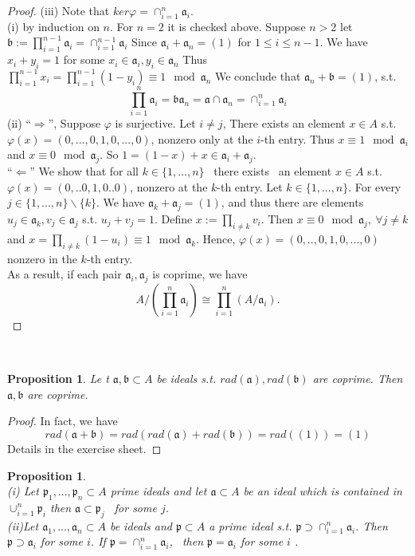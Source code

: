 \documentclass[11pt]{article}
\newtheorem{prop}[thm]{Proposition}
\newcommand{\sca}{{\mathfrak a}}
\newcommand{\scb}{{\mathfrak b}}
\newcommand{\scp}{{\mathfrak p}}
\begin{document}
\begin{proof}
(iii) Note that $ker \varphi =\cap^n_{i=1}\sca_i$.\\
(i) by induction on $n$.
For $n=2$ it is checked above. Suppose $n>2$ let $\scb:=\prod_{i=1}^{n-1}\sca_i=\cap^{n-1}_{i=1}\sca_i$
Since $\sca_i+\sca_n=(1)$ for $1\leq i\leq n-1$. We have $x_i+y_i=1$ for some $x_i\in \sca_i, y_i\in \sca_n$
Thus $\prod_{i=1}^{n-1}x_i= \prod_{i=1}^{n-1}(1-y_i) \equiv 1 \mod \sca_n$
We conclude that $\sca_n+\scb=(1)$, s.t. 
$$
\prod^n_{i=1}\sca_i=\scb \sca_n=\sca\cap \sca_n=\cap_{i=1}^n\sca_i
$$
(ii) ``$\Longrightarrow$'', Suppose $\varphi $ is surjective. Let $i\neq j$, There exists an element $x\in A$ s.t. $\varphi(x)=(0,...,0,1,0,...,0)$, nonzero only at the $i$-th entry.
Thus $x\equiv  1 \mod \sca_i$ and $x\equiv 0\mod \sca_j$.
So $1=(1-x)+x\in \sca_i+\sca_j$.\\
``$\Longleftarrow$'' We show that for all $k\in \{1,...,n\}$
 there exists  an element $x\in A$ s.t. $\varphi(x)=(0,..0,1,0..0)$, nonzero at the $k$-th entry.
Let $k\in \{1,...,n\}$. For every $j\in \{1,...,n\}\backslash\{k\}$.
We have $\sca_k+\sca_j=(1)$, and thus there are elements $u_j\in\sca_k,v_j\in \sca_j$
s.t. $u_j+v_j=1$.
Define $x:=\prod_{i\neq k}v_i$. Then $x\equiv 0 \mod \sca_j,\ \forall j\neq k$ and $x=\prod_{i\neq k}(1-u_i)\equiv 1\mod \sca_k$.
Hence, $\varphi(x)=(0,..,0,1,0,...,0)$ nonzero in the $k$-th entry.\\
As a result, if each pair $\sca_i,\sca_j$ is coprime, we have 
$$
A/\left(\prod_{i=1}^n\sca_i\right)\cong \prod_{i=1}^n\left(A/\sca_i\right).
$$
\end{proof}

 
\begin{prop}
Le t $\sca,\scb\subset  A$ be ideals s.t. $rad(\sca),rad(\scb)$ are coprime. Then $\sca, \scb$ are coprime.
\end{prop}
\begin{proof}
In fact, we have
$$
 rad(\sca+\scb)=rad(rad(\sca)+rad(\scb))=rad((1))=(1)
$$
Details in the exercise sheet.
\end{proof}

\begin{prop}\ \\
(i) Let $\scp_1,..., \scp_n\subset A$ prime ideals and let $\sca \subset A$ be an ideal which is contained in $\cup_{i=1}^n\scp_i$ then $\sca\subset \scp_j$  for some $j$.\\
(ii)Let $\sca_1,...,\sca_n\subset A$ be ideals and $\scp \subset A$ a prime ideal s.t. $\scp \supset \cap_{i=1}^n\sca_i$.
Then $\scp\supset \sca_i$ for some $i$.
If $\scp=\cap_{i=1}^n\sca_i$,  then $\scp =\sca_i $ for some $i$ .
\end{prop}
\end{document}
